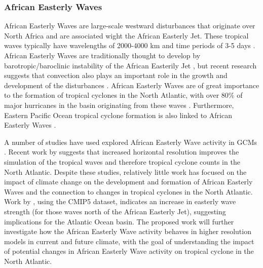 \documentclass[11pt]{article}
\begin{document}
\subsubsection{African Easterly Waves}
African Easterly Waves are large-scale westward disturbances that originate over North Africa and are associated wight the African Easterly Jet. These tropical waves typically have wavelengths of 2000-4000 km and time periods of 3-5 days \citep{Burpee1974,Reed1977}. African Easterly Waves are traditionally thought to develop by barotropic/baroclinic instability of the African Easterily Jet \citep{Burpee1972}, but recent research suggests that convection also plays an important role in the growth and development of the disturbances \citep{Hall2006,Thorncroft2008,Hsieh&Cook2005,Berry&Thorncroft2012}. African Easterly Waves are of great importance to the formation of tropical cyclones in the North Atlantic, with over 80$\%$ of major hurricanes in the basin originating from these waves \citep{Landsea1993}. Furthermore, Eastern Pacific Ocean tropical cyclone formation is also linked to African Easterly Waves \citep{Avila&Pasch1995}. 

A number of studies have used explored African Easterly Wave activity in GCMs \citep{Ruit&DellAquila2010,Daloz2012,Skinner&Diffenbaugh2013,McCrary2014}. Recent work by \citet{Roberts2014} suggests that increased horizontal resolution improves the simulation of the tropical waves and therefore tropical cyclone counts in the North Atlantic.  Despite these studies, relatively little work has focused on the impact of climate change on the development and formation of African Easterly Waves and the connection to changes in tropical cyclones in the North Atlantic. Work by \citet{Skinner&Diffenbaugh2013}, using the CMIP5 dataset, indicates an increase in easterly wave strength (for those waves north of the African Easterly Jet), suggesting implications for the Atlantic Ocean basin. The proposed work will  further investigate how the African Easterly Wave activity behaves in higher resolution models in current and future climate, with the goal of understanding the impact of potential changes in African Easterly Wave activity on tropical cyclone in the North Atlantic.
\end{document}
